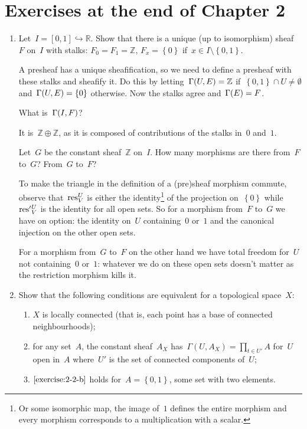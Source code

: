 \documentclass[a4paper,11pt,oneside,openany,article]{memoir}
\begin{document}
\clearpage

\chapter{Exercises at the end of Chapter 2}
\begin{enumerate}
  \item Let~$I=[0,1]\hookrightarrow\mathbb{R}$. Show that there is a unique (up to isomorphism) sheaf~$F$ on~$I$ with stalks: $F_0=F_1=\mathbb{Z}$, $F_x=\left\{ 0 \right\}$ if~$x\in I\setminus\left\{ 0,1 \right\}$.

    \begin{solution}
      A presheaf has a unique sheafification, so we need to define a presheaf with these stalks and sheafify it. Do this by letting~$\mathrm{\Gamma}(U,E)=\mathbb{Z}$ if~$\left\{ 0,1 \right\}\cap U\neq\emptyset$ and~$\mathrm{\Gamma}(U,E)=\left\{ 0 \right\}$ otherwise. Now the stalks agree and~$\mathrm{\Gamma}(E)=F$.
    \end{solution}

    What is~$\mathrm{\Gamma}(I, F)$?

    \begin{solution}
      It is~$\mathbb{Z}\oplus\mathbb{Z}$, as it is composed of contributions of the stalks in~$0$ and~$1$.
    \end{solution}

    Let~$G$ be the constant sheaf~$\mathbb{Z}$ on~$I$. How many morphisms are there from~$F$ to~$G$? From~$G$ to~$F$?

    \begin{solution}
      To make the triangle in the definition of a (pre)sheaf morphism commute, observe that~$\mathrm{res}_V^U$ is either the identity\footnote{Or some isomorphic map, the image of~$1$ defines the entire morphism and every morphism corresponds to a multiplication with a scalar.} of the projection on~$\left\{ 0 \right\}$ while~$\mathrm{res}'{}^U_V$ is the identity for all open sets. So for a morphism from~$F$ to~$G$ we have on option: the identity on~$U$ containing~$0$ or~$1$ and the canonical injection on the other open sets.

      For a morphism from~$G$ to~$F$ on the other hand we have total freedom for~$U$ not containing~$0$ or~$1$: whatever we do on these open sets doesn't matter as the restriction morphism kills it.
    \end{solution}

  \item Show that the following conditions are equivalent for a topological space~$X$:
    \begin{enumerate}
      \item\label{exercise:2-2-a} $X$ is locally connected (that is, each point has a base of connected neighbourhoods);
      \item\label{exercise:2-2-b} for any set~$A$, the constant sheaf~$A_X$ has~$\Gamma(U,A_X)=\prod_{t\in U'}A$ for~$U$ open in~$A$ where~$U'$ is the set of connected components of~$U$;
      \item\label{exercise:2-2-c} $\ref{exercise:2-2-b}$ holds for~$A=\left\{ 0,1 \right\}$, some set with two elements.
    \end{enumerate}


\end{enumerate}
\end{document}
